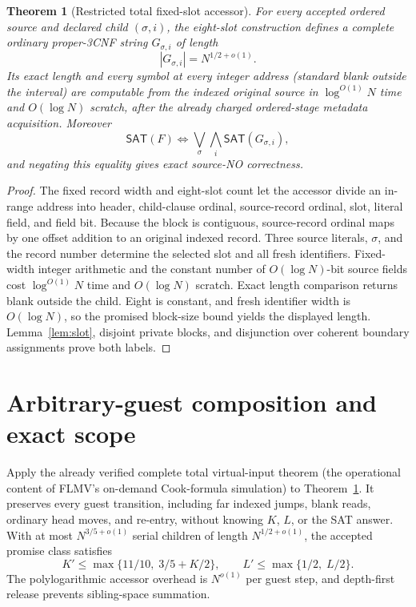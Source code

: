 \documentclass[11pt]{article}
\newtheorem{theorem}{Theorem}
\newcommand{\SAT}{\mathsf{SAT}}
\begin{document}
\begin{theorem}[Restricted total fixed-slot accessor]\label{th:access}
For every accepted ordered source and declared child $(\sigma,i)$, the eight-slot construction defines a complete ordinary proper-3CNF string $G_{\sigma,i}$ of length
\[
 |G_{\sigma,i}|=N^{1/2+o(1)}.
\]
Its exact length and every symbol at every integer address (standard blank outside the interval) are computable from the indexed original source in $\log^{O(1)}N$ time and $O(\log N)$ scratch, after the already charged ordered-stage metadata acquisition.  Moreover
\[
 \SAT(F)\iff
 \bigvee_{\sigma}\bigwedge_i\SAT(G_{\sigma,i}),
\]
and negating this equality gives exact source-NO correctness.
\end{theorem}
\begin{proof}
The fixed record width and eight-slot count let the accessor divide an in-range address into header, child-clause ordinal, source-record ordinal, slot, literal field, and field bit.  Because the block is contiguous, source-record ordinal maps by one offset addition to an original indexed record.  Three source literals, $\sigma$, and the record number determine the selected slot and all fresh identifiers.  Fixed-width integer arithmetic and the constant number of $O(\log N)$-bit source fields cost $\log^{O(1)}N$ time and $O(\log N)$ scratch.  Exact length comparison returns blank outside the child.  Eight is constant, and fresh identifier width is $O(\log N)$, so the promised block-size bound yields the displayed length.  Lemma~\ref{lem:slot}, disjoint private blocks, and disjunction over coherent boundary assignments prove both labels.\end{proof}

\section{Arbitrary-guest composition and exact scope}
Apply the already verified complete total virtual-input theorem (the operational content of FLMV's on-demand Cook-formula simulation) to Theorem~\ref{th:access}.  It preserves every guest transition, including far indexed jumps, blank reads, ordinary head moves, and re-entry, without knowing $K$, $L$, or the SAT answer.  With at most $N^{3/5+o(1)}$ serial children of length $N^{1/2+o(1)}$, the accepted promise class satisfies
\[
 K'\le\max\{11/10,\;3/5+K/2\},\qquad
 L'\le\max\{1/2,\;L/2\}.
\]
The polylogarithmic accessor overhead is $N^{o(1)}$ per guest step, and depth-first release prevents sibling-space summation.
\end{document}

